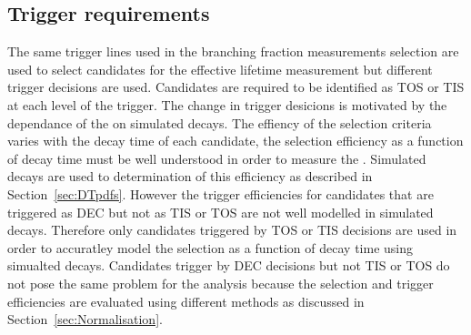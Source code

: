 \subsection{Trigger requirements}
\label{sec:ELtrigger}
The same trigger lines used in the branching fraction measurements selection are used to select candidates for the effective lifetime measurement but different trigger decisions are used. 
Candidates are required to be identified as TOS or TIS at each level of the trigger. The change in trigger desicions is motivated by the dependance of the \elm on simulated decays. The effiency of the selection criteria varies with the decay time of each candidate, the selection efficiency as a function of decay time must be well understood in order to measure the \el. Simulated decays are used to determination of this efficiency as described in Section~\ref{sec:DTpdfs}. However the trigger efficiencies for candidates that are triggered as DEC but not as TIS or TOS are not well modelled in simulated decays. Therefore only candidates triggered by TOS or TIS decisions are used in order to accuratley model the selection as a function of decay time using simualted decays. 
Candidates trigger by DEC decisions but not TIS or TOS do not pose the same problem for the \BF analysis because the selection and trigger efficiencies are evaluated using different methods as discussed in Section~\ref{sec:Normalisation}.

